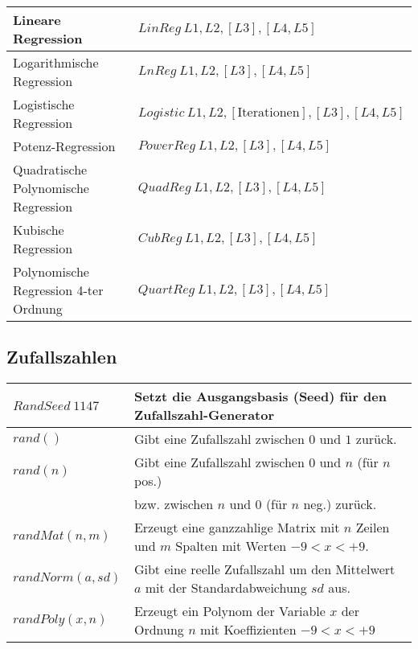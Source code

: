 \begin{tabular}{|l|l|}
	\hline
	Lineare Regression						&	$LinReg \: L1,L2,[L3],[L4,L5]$ \\ \hline
	Logarithmische Regression				&	$LnReg \: L1,L2,[L3],[L4,L5]$ \\ \hline
	Logistische Regression					&	$Logistic \: L1,L2,[\text{Iterationen}],[L3],[L4,L5]$\\ \hline
	Potenz-Regression						&	$PowerReg \: L1,L2,[L3],[L4,L5]$ \\ \hline
	Quadratische Polynomische Regression	&	$QuadReg \: L1,L2,[L3],[L4,L5]$ \\ \hline
	Kubische Regression						&	$CubReg \: L1,L2,[L3],[L4,L5]$ \\ \hline
	Polynomische Regression 4-ter Ordnung	&	$QuartReg \: L1,L2,[L3],[L4,L5]$ \\ \hline
\end{tabular}

\subsection{Zufallszahlen}
\begin{tabular}{|l|l|}
	\hline
	$RandSeed \: 1147$					& Setzt die Ausgangsbasis (Seed) für den Zufallszahl-Generator \\ \hline
	$rand()$							& Gibt eine Zufallszahl zwischen $0$ und $1$ zurück. \\
	$rand(n)$							& Gibt eine Zufallszahl zwischen $0$ und $n$ (für $n$ pos.) \\ 
										& bzw. zwischen $n$ und $0$ (für $n$ neg.) zurück. \\ \hline
	$randMat(n,m)$						& Erzeugt eine ganzzahlige Matrix mit $n$ Zeilen und $m$ Spalten mit Werten $-9<x<+9$. \\ \hline
	$randNorm(a,sd)$					& Gibt eine reelle Zufallszahl um den Mittelwert $a$ mit der Standardabweichung $sd$ aus. \\ \hline
	$randPoly(x,n)$						& Erzeugt ein Polynom der Variable $x$ der Ordnung $n$ mit Koeffizienten $-9<x<+9$ \\ \hline
\end{tabular}